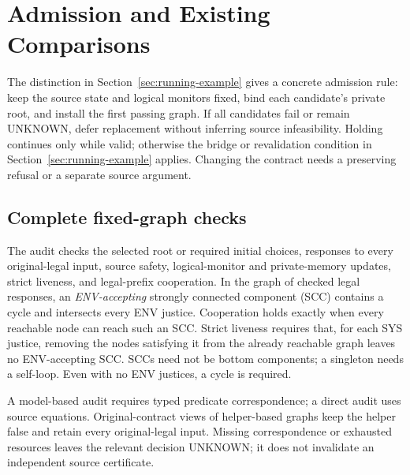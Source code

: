 \section{Admission and Existing Comparisons}\label{sec:replication}
The distinction in Section~\ref{sec:running-example} gives a concrete
admission rule: keep the source state and logical monitors fixed,
bind each candidate's private root, and install the first passing graph.
If all candidates fail or remain UNKNOWN, defer replacement without
inferring source infeasibility. Holding continues only while valid;
otherwise the bridge or revalidation condition in
Section~\ref{sec:running-example} applies. Changing the contract needs a
preserving refusal or a separate source argument.

\subsection{Complete fixed-graph checks}
The audit checks the selected root or required initial choices,
responses to every original-legal input, source safety, logical-monitor
and private-memory updates, strict liveness, and legal-prefix cooperation.
In the graph of checked legal responses, an \emph{ENV-accepting} strongly
connected component (SCC) contains a cycle and intersects every ENV justice.
Cooperation holds exactly when every reachable node can reach such an SCC.
Strict liveness requires that, for each SYS justice, removing the nodes
satisfying it from the already reachable graph leaves no ENV-accepting SCC. SCCs need not be bottom
components; a singleton needs a self-loop. Even with no ENV justices,
a cycle is required.

A model-based audit requires typed predicate correspondence; a direct
audit uses source equations. Original-contract views of helper-based
graphs keep the helper false and retain every original-legal input.
Missing correspondence or exhausted resources leaves the relevant decision
UNKNOWN; it does not invalidate an independent source certificate.

